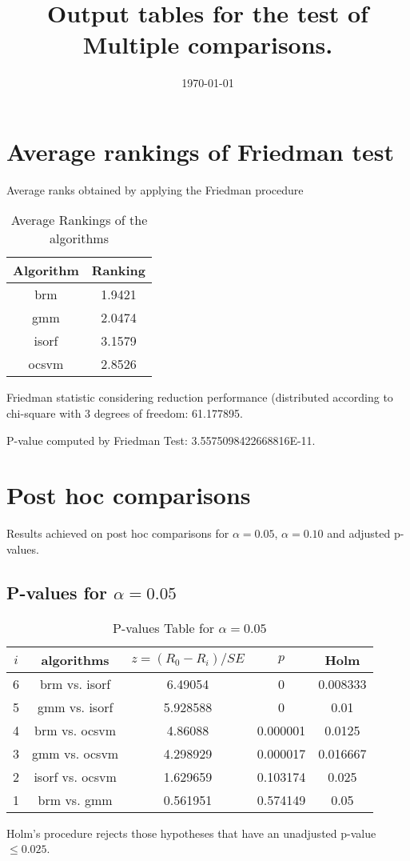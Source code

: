 \documentclass[a4paper,10pt]{article}
\title{Output tables for the test of Multiple comparisons.}
\author{}
\date{\today}
\begin{document}
\begin{landscape}
\pagestyle{empty}
\maketitle
\thispagestyle{empty}
\section{Average rankings of Friedman test}



Average ranks obtained by applying the Friedman procedure

\begin{table}[!htp]
\centering
\begin{tabular}{|c|c|}\hline
Algorithm&Ranking\\\hline
brm & 1.9421\\
gmm & 2.0474\\
isorf & 3.1579\\
ocsvm & 2.8526\\
\hline
\end{tabular}
\caption{Average Rankings of the algorithms}
\end{table}

Friedman statistic considering reduction performance (distributed according to chi-square with 3 degrees of freedom: 61.177895.

P-value computed by Friedman Test: 3.5575098422668816E-11.\newline



\pagebreak

\section{Post hoc comparisons}

Results achieved on post hoc comparisons for $\alpha = 0.05$, $\alpha = 0.10$ and adjusted p-values.

\subsection{P-values for $\alpha=0.05$}

\begin{table}[!htp]
\centering\scriptsize
\begin{tabular}{ccccc}
$i$&algorithms&$z=(R_0 - R_i)/SE$&$p$&Holm\\
\hline6&brm vs. isorf&6.49054&0&0.008333\\
5&gmm vs. isorf&5.928588&0&0.01\\
4&brm vs. ocsvm&4.86088&0.000001&0.0125\\
3&gmm vs. ocsvm&4.298929&0.000017&0.016667\\
2&isorf vs. ocsvm&1.629659&0.103174&0.025\\
1&brm vs. gmm&0.561951&0.574149&0.05\\
\hline
\end{tabular}
\caption{P-values Table for $\alpha=0.05$}
\end{table}Holm's procedure rejects those hypotheses that have an unadjusted p-value $\le0.025$.


\end{landscape}
\end{document}
